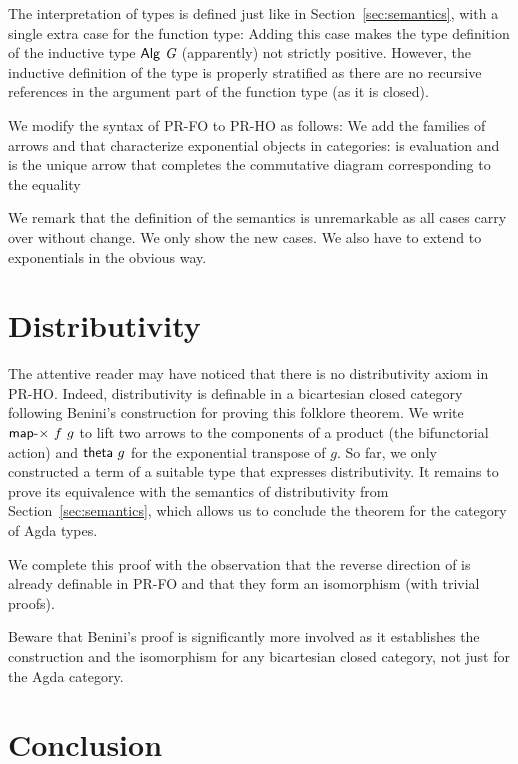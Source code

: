 \documentclass[a4paper,USenglish,cleveref, autoref, thm-restate]{lipics-v2021}
\begin{document}
The interpretation of types is defined just like in
Section~\ref{sec:semantics}, with a single extra case for the function type:
\cccDataAlgArrow
Adding this case makes the type definition of the inductive type
${\AAlg{~G}}$ (apparently) not strictly positive. However, the
inductive definition of the type is properly stratified as there are
no recursive references in the argument part of the function type (as
it is closed).

We modify the syntax of PR-FO to PR-HO as follows:
\cccPRIND
We add the families of arrows {\Alam} and {\Aapply} that characterize
exponential objects in categories: {\Aapply} is evaluation and {\Alam}
is the unique arrow that completes the commutative diagram
corresponding to the equality
\cccExpComm

We remark that the definition of the semantics is
unremarkable as all cases carry over without change. We only show the
new cases. 
\cccEvalExponential
We also have to extend {\Afmap} to exponentials in the obvious way.

\section{Distributivity}
\label{sec:distributivity}


The attentive reader may have noticed that there is no
distributivity axiom in PR-HO.
Indeed, distributivity is definable in a bicartesian closed category
following Benini's construction
\cite{https://doi.org/10.48550/arxiv.1406.0961} for proving this
folklore theorem. We write ${\Amapx}~f ~g $ to lift two arrows to the
components of a product (the bifunctorial action) and ${\Atheta}~g$ for
the exponential transpose of $g$.
\cccThetaDist
So far, we only constructed a term {\Adist} of a suitable type that expresses
distributivity. It remains to prove its equivalence with the semantics of
distributivity from Section~\ref{sec:semantics}, which allows us to conclude
the theorem for the category of Agda types. 
\cccEvalDistEqual

We complete this proof with the observation that the reverse direction
of {\Adist} is already definable in PR-FO and that they form an
isomorphism (with trivial proofs).
\cccUndist
\vspace{-2\baselineskip}
\cccDistUndist

Beware that Benini's proof
\cite{https://doi.org/10.48550/arxiv.1406.0961} is significantly more
involved as it establishes the construction and the isomorphism for
any bicartesian closed category, not just for the Agda category.

\section{Conclusion}
\label{sec:conclusion}





\end{document}
